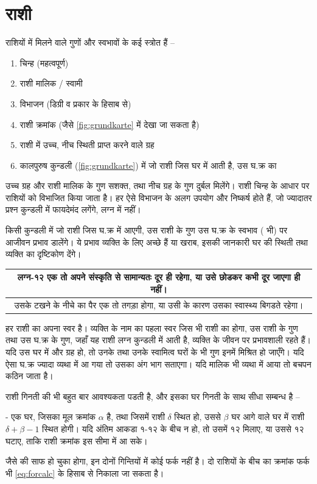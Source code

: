 \section[राशी]{राशी} \label{sec:zeichen}
राशियों में मिलने वाले गुणों और स्वभावों के कई स्त्रोत हैं --
\begin{enumerate}
    \item चिन्ह (महत्वपूर्ण)
    \item राशी मालिक / स्वामी
    \item विभाजन (डिग्री व प्रकार के हिसाब से)
    \item राशी क्रमांक (जैसे \autoref{fig:grundkarte} में देखा जा सकता है)
    \item राशी में उच्च, नीच स्थिती प्राप्त करने वाले ग्रह
    \item कालपुरुष कुन्डली (\autoref{fig:grundkarte}) में जो राशी जिस घर में आती है, उस  घ.क्र का 
\end{enumerate}
उच्च ग्रह और राशी मालिक के गुण सशक्त, तथा नीच ग्रह के गुण दुर्बल मिलेंगे। राशी चिन्ह के आधार पर राशियों को विभाजित किया जाता है।  हर ऐसे विभाजन के  अलग उपयोग और निष्कर्ष होते हैं, जो ज्यादातर प्रश्न कुन्डली में फायदेमंद लगेंगे, लग्न में नहीं।

किसी कुन्डली में जो राशी जिस घ.क्र में आएगी, उस राशी के गुण उस घ.क्र के स्वभाव ( भी) पर  आजीवन प्रभाव डालेंगे।  ये प्रभाव व्यक्ति के लिए अच्छे हैं या खराब, इसकी जानकारी घर की स्थिती तथा व्यक्ति का दृष्टिकोण देंगे।
\begin{example}
    \begin{tabular}{c}
लग्न-१२  एक तो अपने संस्कृति से सामान्यतः दूर ही रहेगा, या उसे छोडकर कभी दूर जाएगा ही नहीं। \\\hline उसके टखने के नीचे का पैर एक तो  तगड़ा होगा, या उसी के कारण उसका स्वास्थ्य बिगडते रहेगा।
    \end{tabular}
\end{example}
हर राशी का अपना स्वर  है। व्यक्ति के नाम का पहला स्वर जिस भी राशी का होगा, उस राशी के गुण तथा  उस घ.क्र के गुण, जहाँ यह राशी लग्न कुन्डली में आती है, व्यक्ति के जीवन पर प्रभावशाली रहते हैं। यदि उस घर में और ग्रह हो, तो उनके तथा उनके स्वामित्व घरों के भी गुण इनमें मिश्रित हो जाएँगे। यदि ऐसा घ.क्र  ज्यादा व्यथा में  आ गया तो उसका अंग भाग सताएगा। यदि मालिक  भी व्यथा में आया तो बचपन कठिन जाता है।

राशी गिनती की भी बहुत बार आवश्यकता पडती है, और इसका घर गिनती के साथ सीधा सम्बन्ध है --
\begin{setdef}
     - एक घर, जिसका मूल क्रमांक $\alpha$ है, तथा जिसमें राशी $\delta$ स्थित हो, उससे $\beta$ घर आगे वाले घर में राशी $\delta+\beta-1$ स्थित होगी। यदि अंतिम आकडा १-१२ के बीच न हो, तो उसमें १२ मिलाए, या उससे १२ घटाए, ताकि राशी क्रमांक इस सीमा में आ सके।
\end{setdef}
जैसे की साफ हो चुका होगा, इन दोनों गिन्तियों में कोई फर्क नहीं है। दो राशियों के बीच का क्रमांक फर्क भी \autoref{eq:forcalc} के हिसाब से निकाला जा सकता है।
